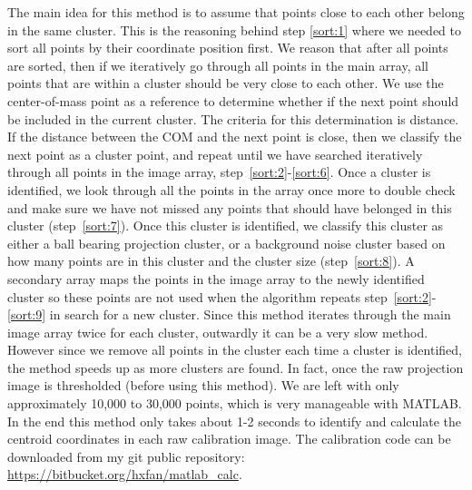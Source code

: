 The main idea for this method is to assume that points close to each other belong in the same cluster.  This is the reasoning behind step \ref{sort:1} where we needed to sort all points by their coordinate position first.  We reason that after all points are sorted, then if we iteratively go through all points in the main array, all points that are within a cluster should be very close to each other.  We use the center-of-mass point as a reference to determine whether if the next point should be included in the current cluster.  The criteria for this determination is distance.  If the distance between the COM and the next point is close, then we classify the next point as a cluster point, and repeat until we have searched iteratively through all points in the image array, step~\ref{sort:2}-\ref{sort:6}.  Once a cluster is identified, we look through all the points in the array once more to double check and make sure we have not missed any points that should have belonged in this cluster (step~\ref{sort:7}).  Once this cluster is identified, we classify this cluster as either a ball bearing projection cluster, or a background noise cluster based on how many points are in this cluster and the cluster size (step~\ref{sort:8}).  A secondary array maps the points in the image array to the newly identified cluster so these points are not used when the algorithm repeats step~\ref{sort:2}-\ref{sort:9} in search for a new cluster.  Since this method iterates through the main image array twice for each cluster, outwardly it can be a very slow method.  However since we remove all points in the cluster each time a cluster is identified, the method speeds up as more clusters are found.  In fact, once the raw projection image is thresholded (before using this method).  We are left with only approximately 10,000 to 30,000 points, which is very manageable with MATLAB.  In the end this method only takes about 1-2 seconds to identify and calculate the centroid coordinates in each raw calibration image.  The calibration code can be downloaded from my git public repository: \url{https://bitbucket.org/hxfan/matlab_calc}.

